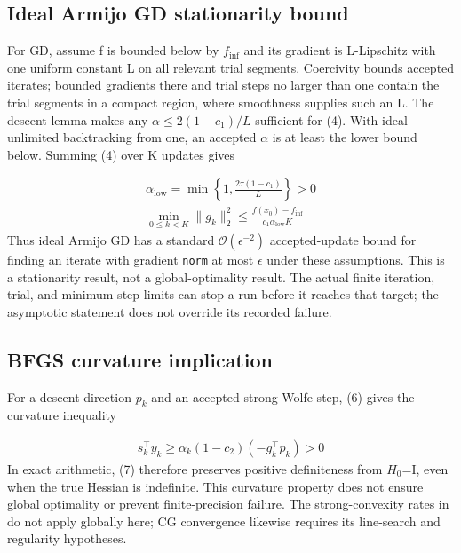 \documentclass[10pt]{article}
\begin{document}
\subsection{Ideal Armijo GD stationarity bound}
For GD, assume f is bounded below by \(f_{\inf}\) and its gradient is L-Lipschitz with one uniform constant L on all relevant trial segments. Coercivity bounds accepted iterates; bounded gradients there and trial steps no larger than one contain the trial segments in a compact region, where smoothness supplies such an L. The descent lemma makes any \(\alpha\leq2(1-c_1)/L\) sufficient for (4). With ideal unlimited backtracking from one, an accepted \(\alpha\) is at least the lower bound below. Summing (4) over K updates gives

\setcounter{equation}{7}
\begin{equation}
\begin{aligned}
\alpha_{\mathrm{low}}=\min\left\{1,\frac{2\tau(1-c_1)}{L}\right\}>0 \\
\min_{0\leq k<K}\|g_k\|_2^2\leq\frac{f(x_0)-f_{\inf}}{c_1\alpha_{\mathrm{low}}K}
\end{aligned}
\label{eq:gd_bound}
\end{equation}
Thus ideal Armijo GD has a standard \(\mathcal{O}(\epsilon^{-2})\) accepted-update bound for finding an iterate with gradient \texttt{norm} at most \(\epsilon\) under these assumptions. This is a stationarity result, not a global-optimality result. The actual finite iteration, trial, and minimum-step limits can stop a run before it reaches that target; the asymptotic statement does not override its recorded failure.

\setcounter{section}{4}
\setcounter{subsection}{4}
\subsection{BFGS curvature implication}
For a descent direction \(p_k\) and an accepted strong-Wolfe step, (6) gives the curvature inequality

\setcounter{equation}{8}
\begin{equation}
\begin{aligned}
s_k^\top y_k\geq\alpha_k(1-c_2)(-g_k^\top p_k)>0
\end{aligned}
\label{eq:curvature}
\end{equation}
In exact arithmetic, (7) therefore preserves positive definiteness from \(H_0\)=I, even when the true Hessian is indefinite. This curvature property does not ensure global optimality or prevent finite-precision failure. The strong-convexity rates in \cite{ref5} do not apply globally here; CG convergence likewise requires its line-search and regularity hypotheses.
\end{document}
